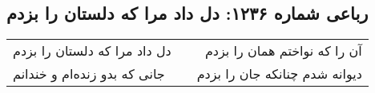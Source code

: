 \begin{center}
\section*{رباعی شماره ۱۲۳۶: دل داد مرا که دلستان را بزدم}
\label{sec:1236}
\begin{longtable}{l p{0.5cm} r}
دل داد مرا که دلستان را بزدم
&&
آن را که نواختم همان را بزدم
\\
جانی که بدو زنده‌ام و خندانم
&&
دیوانه شدم چنانکه جان را بزدم
\\
\end{longtable}
\end{center}
